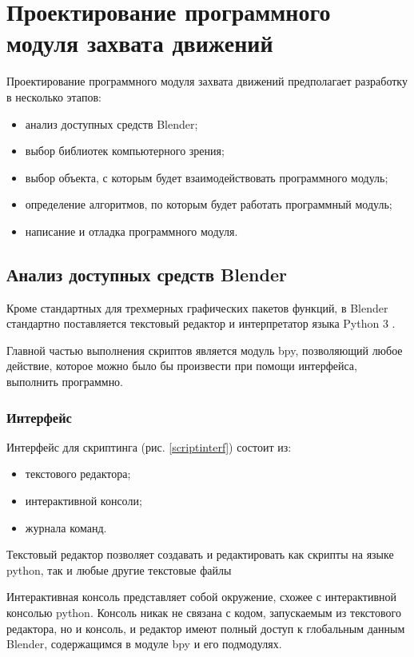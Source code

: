 \section{Проектирование программного модуля захвата движений}

Проектирование программного модуля захвата движений предполагает разработку в несколько этапов:
\begin{itemize}
	\item анализ доступных средств Blender;
	\item выбор библиотек компьютерного зрения;
	\item выбор объекта, с которым будет взаимодействовать программного модуль;
	\item определение алгоритмов, по которым будет работать программный модуль;
	\item написание и отладка программного модуля.
\end{itemize}


\subsection{Анализ доступных средств Blender}

Кроме стандартных для трехмерных графических пакетов функций, в Blender стандартно поставляется текстовый редактор и интерпретатор языка Python 3 \cite{blenderprogbook}.

Главной частью выполнения скриптов является модуль bpy, позволяющий любое действие, которое можно было бы произвести при помощи интерфейса, выполнить программно.

\subsubsection{Интерфейс}
Интерфейс для скриптинга (рис. \ref{scriptinterf}) состоит из:
\begin{itemize}
	\item текстового редактора;
	\item интерактивной консоли;
	\item журнала команд.
\end{itemize}

Текстовый редактор позволяет создавать и редактировать как скрипты на языке python, так и любые другие текстовые файлы

Интерактивная консоль представляет собой окружение, схожее с интерактивной консолью python. Консоль никак не связана с кодом, запускаемым из текстового редактора, но и консоль, и редактор имеют полный доступ к глобальным данным Blender, содержащимся в модуле bpy и его подмодулях.

